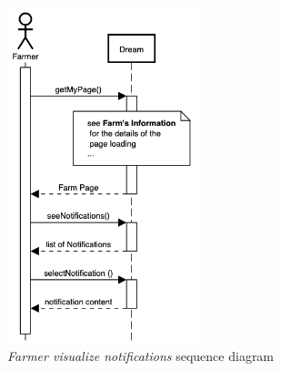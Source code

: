 \begin{enumerate}
    \begin{figure}[H]
        \begin{center}
        \includegraphics[width=0.5\textwidth]{sequence/SeeNotifications.png}
        \caption{\emph{Farmer visualize notifications} sequence diagram}
        \label{fig:sequence9}
        \end{center}
    \end{figure}


\end{enumerate}
